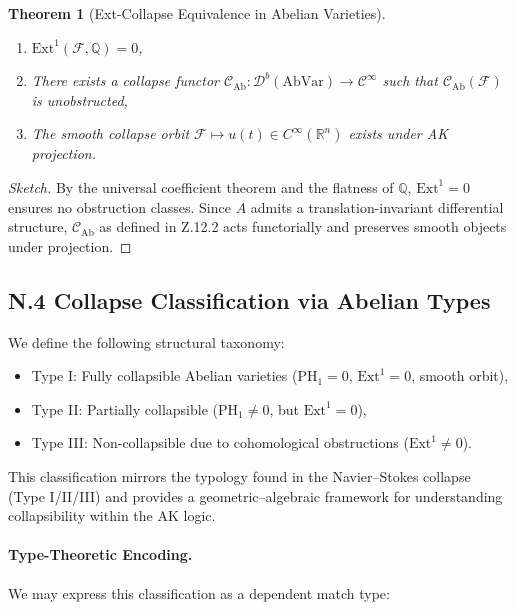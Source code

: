 \documentclass[11pt]{article}
\newtheorem{theorem}{Theorem}[section]
\begin{document}
\begin{axiom}
\begin{axiom}
{{\begin{theorem}[Ext-Collapse Equivalence in Abelian Varieties]
\begin{enumerate}
  \item \( \mathrm{Ext}^1(\mathcal{F}, \mathbb{Q}) = 0 \),
  \item There exists a collapse functor \( \mathcal{C}_{\mathrm{Ab}} : \mathcal{D}^b(\mathrm{AbVar}) \to \mathcal{C}^\infty \)  
  such that \( \mathcal{C}_{\mathrm{Ab}}(\mathcal{F}) \) is unobstructed,
  \item The smooth collapse orbit \( \mathcal{F} \mapsto u(t) \in C^\infty(\mathbb{R}^n) \) exists under AK projection.
\end{enumerate}
\end{theorem}

\begin{proof}[Sketch]
By the universal coefficient theorem and the flatness of \( \mathbb{Q} \), \( \mathrm{Ext}^1 = 0 \) ensures no obstruction classes.  
Since \( A \) admits a translation-invariant differential structure, \( \mathcal{C}_{\mathrm{Ab}} \) as defined in Z.12.2 acts functorially and preserves smooth objects under projection.
\end{proof}


\subsection*{N.4 Collapse Classification via Abelian Types}

We define the following structural taxonomy:

\begin{itemize}
  \item Type I: Fully collapsible Abelian varieties (\( \mathrm{PH}_1 = 0 \), \( \mathrm{Ext}^1 = 0 \), smooth orbit),
  \item Type II: Partially collapsible (\( \mathrm{PH}_1 \neq 0 \), but \( \mathrm{Ext}^1 = 0 \)),
  \item Type III: Non-collapsible due to cohomological obstructions (\( \mathrm{Ext}^1 \neq 0 \)).
\end{itemize}

This classification mirrors the typology found in the Navier–Stokes collapse (Type I/II/III) and provides a geometric–algebraic framework for understanding collapsibility within the AK logic.

\paragraph{Type-Theoretic Encoding.}

We may express this classification as a dependent match type:

}}
\end{axiom}
\end{axiom}
\end{document}
